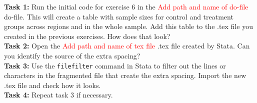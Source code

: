 \documentclass[12pts]{report}
\begin{document}
\textbf{Task 1:} Run the initial code for exercise 6 in the \textcolor{red}{Add path and name of do-file} do-file. This will create a table with sample sizes for control and treatment groups across regions and in the whole sample. Add this table to the .tex file you created in the previous exercises. How does that look?\\

\textbf{Task 2:} Open the \textcolor{red}{Add path and name of tex file} .tex file created by Stata. Can you identify the source of the extra spacing?\\

\textbf{Task 3:} Use the \texttt{filefilter} command in Stata to filter out the lines or characters in the fragmented file that create the extra spacing. Import the new .tex file and check how it looks.\\

\textbf{Task 4:} Repeat task 3 if necessary.
\end{document}
